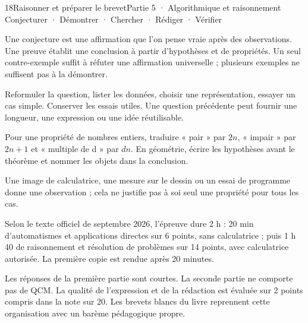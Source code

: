 \begin{ouverture}[algorithmique]{18}{Raisonner et préparer le brevet}{Partie 5 · Algorithmique et raisonnement}
{Conjecturer · Démontrer · Chercher · Rédiger · Vérifier}
\end{ouverture}
\pagestyle{otMain}\essentiel\fontsize{11}{15}\selectfont
{}
\begin{definition}Une conjecture est une affirmation que l’on pense vraie après des observations. Une preuve établit une conclusion à partir d’hypothèses et de propriétés. Un seul contre-exemple suffit à réfuter une affirmation universelle ; plusieurs exemples ne suffisent pas à la démontrer.\end{definition}
\begin{savoirfaire}[Chercher]Reformuler la question, lister les données, choisir une représentation, essayer un cas simple. Conserver les essais utiles. Une question précédente peut fournir une longueur, une expression ou une idée réutilisable.\end{savoirfaire}
\begin{savoirfaire}[Démontrer]Pour une propriété de nombres entiers, traduire « pair » par $2n$, « impair » par $2n+1$ et « multiple de d » par $dn$. En géométrie, écrire les hypothèses avant le théorème et nommer les objets dans la conclusion.\end{savoirfaire}
\begin{attention}Une image de calculatrice, une mesure sur le dessin ou un essai de programme donne une observation ; cela ne justifie pas à soi seul une propriété pour tous les cas.\end{attention}
\clearpage
{}
\begin{savoirfaire}[Brevet 2027]Selon le texte officiel de septembre 2026, l’épreuve dure 2 h : 20 min d’automatismes et applications directes sur 6 points, sans calculatrice ; puis 1 h 40 de raisonnement et résolution de problèmes sur 14 points, avec calculatrice autorisée. La première copie est rendue après 20 minutes.\end{savoirfaire}
\begin{propriete}Les réponses de la première partie sont courtes. La seconde partie ne comporte pas de QCM. La qualité de l’expression et de la rédaction est évaluée sur 2 points compris dans la note sur 20. Les brevets blancs du livre reprennent cette organisation avec un barème pédagogique propre.\end{propriete}
